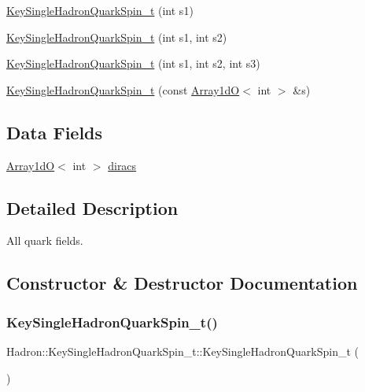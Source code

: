 \begin{DoxyCompactItemize}
\mbox{\hyperlink{structHadron_1_1KeySingleHadronQuarkSpin__t_adf80ea1775391ee8eb530185684343aa}{Key\+Single\+Hadron\+Quark\+Spin\+\_\+t}} (int s1)
\item 
\mbox{\hyperlink{structHadron_1_1KeySingleHadronQuarkSpin__t_a649d988b46181870449e3d527bb526e5}{Key\+Single\+Hadron\+Quark\+Spin\+\_\+t}} (int s1, int s2)
\item 
\mbox{\hyperlink{structHadron_1_1KeySingleHadronQuarkSpin__t_afec33cba311846572f37275a069d28af}{Key\+Single\+Hadron\+Quark\+Spin\+\_\+t}} (int s1, int s2, int s3)
\item 
\mbox{\hyperlink{structHadron_1_1KeySingleHadronQuarkSpin__t_afb7c4a9f15434b71a4782713c1e0339f}{Key\+Single\+Hadron\+Quark\+Spin\+\_\+t}} (const \mbox{\hyperlink{classADAT_1_1Array1dO}{Array1dO}}$<$ int $>$ \&s)
\end{DoxyCompactItemize}
\subsection*{Data Fields}
\begin{DoxyCompactItemize}
\item 
\mbox{\hyperlink{classADAT_1_1Array1dO}{Array1dO}}$<$ int $>$ \mbox{\hyperlink{structHadron_1_1KeySingleHadronQuarkSpin__t_ac351a0ae22cfe303f2951feb0261e083}{diracs}}
\end{DoxyCompactItemize}


\subsection{Detailed Description}
All quark fields. 

\subsection{Constructor \& Destructor Documentation}
\mbox{\label{structHadron_1_1KeySingleHadronQuarkSpin__t_a5343b9bcb3637c3cbfd403c1fdcee16a}} 
\subsubsection{\texorpdfstring{KeySingleHadronQuarkSpin\_t()}{KeySingleHadronQuarkSpin\_t()}\hspace{0.1cm}{\footnotesize\ttfamily [1/15]}}
{\footnotesize\ttfamily Hadron\+::\+Key\+Single\+Hadron\+Quark\+Spin\+\_\+t\+::\+Key\+Single\+Hadron\+Quark\+Spin\+\_\+t (\begin{DoxyParamCaption}{ }\end{DoxyParamCaption})\hspace{0.3cm}{\ttfamily [inline]}}

